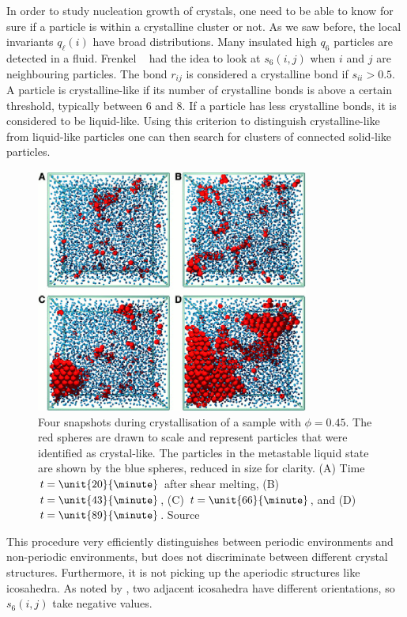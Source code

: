 In order to study nucleation growth of crystals, one need to be able to know for sure if a particle is within a crystalline cluster or not. As we saw before, the local invariants $q_{\ell}(i)$ have broad distributions. Many insulated high $q_6$ particles are detected in a fluid. Frenkel ~\citep{wolde:9932} had the idea to look at $s_6(i,j)$ when $i$ and $j$ are neighbouring particles. The bond $r_{ij}$ is considered a crystalline bond if $s_{ii}>0.5$. A particle is crystalline-like if its number of crystalline bonds is above a certain threshold, typically between 6 and 8. If a particle has less crystalline bonds, it is considered to be liquid-like. Using this criterion to distinguish crystalline-like from liquid-like particles one can then search for clusters of connected solid-like particles.

\begin{figure}
	\centering
	\includegraphics[width=0.8\textwidth]{gasser_nucleus}
	\caption{Four snapshots during crystallisation of a sample with $\phi=0.45$. The red spheres are drawn to scale and represent particles that were identified as crystal-like. The particles in the metastable liquid state are shown by the blue spheres, reduced in size for clarity. (A) Time $t=\unit{20}{\minute}$ after shear melting, (B) $t=\unit{43}{\minute}$, (C) $t=\unit{66}{\minute}$, and (D) $t=\unit{89}{\minute}$. Source }
	\label{fig:nucleus}
\end{figure}

This procedure very efficiently distinguishes between periodic environments and non-periodic environments, but does not discriminate between different crystal structures. Furthermore, it is not picking up the aperiodic structures like icosahedra. As noted by \citet{Tomida1995}, two adjacent icosahedra have different orientations, so $s_6(i,j)$ take negative values.

